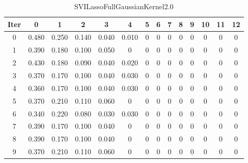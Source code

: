 \begin{table}
	\begin{center}
		\begin{tabular}{|c|c|c|c|c|c|c|c|c|c|c|c|c|c|}
			\hline
			Iter & 0 & 1 & 2 & 3 & 4 & 5 & 6 & 7 & 8 & 9 & 10 & 11 & 12 \\
			\hline
			0 & 0.480 & 0.250 & 0.140 & 0.040 & 0.010 & 0 & 0 & 0 & 0 & 0 & 0 & 0 & 0 \\
			\hline
			1 & 0.390 & 0.180 & 0.100 & 0.050 & 0 & 0 & 0 & 0 & 0 & 0 & 0 & 0 & 0 \\
			\hline
			2 & 0.430 & 0.180 & 0.090 & 0.040 & 0.020 & 0 & 0 & 0 & 0 & 0 & 0 & 0 & 0 \\
			\hline
			3 & 0.370 & 0.170 & 0.100 & 0.040 & 0.030 & 0 & 0 & 0 & 0 & 0 & 0 & 0 & 0 \\
			\hline
			4 & 0.360 & 0.170 & 0.100 & 0.040 & 0.030 & 0 & 0 & 0 & 0 & 0 & 0 & 0 & 0 \\
			\hline
			5 & 0.370 & 0.210 & 0.110 & 0.060 & 0 & 0 & 0 & 0 & 0 & 0 & 0 & 0 & 0 \\
			\hline
			6 & 0.340 & 0.220 & 0.080 & 0.030 & 0.030 & 0 & 0 & 0 & 0 & 0 & 0 & 0 & 0 \\
			\hline
			7 & 0.390 & 0.170 & 0.100 & 0.040 & 0 & 0 & 0 & 0 & 0 & 0 & 0 & 0 & 0 \\
			\hline
			8 & 0.390 & 0.170 & 0.100 & 0.040 & 0 & 0 & 0 & 0 & 0 & 0 & 0 & 0 & 0 \\
			\hline
			9 & 0.370 & 0.210 & 0.110 & 0.060 & 0 & 0 & 0 & 0 & 0 & 0 & 0 & 0 & 0 \\
			\hline
		\end{tabular}
	\end{center}
	\caption{SVILassoFullGaussianKernel2.0}
\end{table}